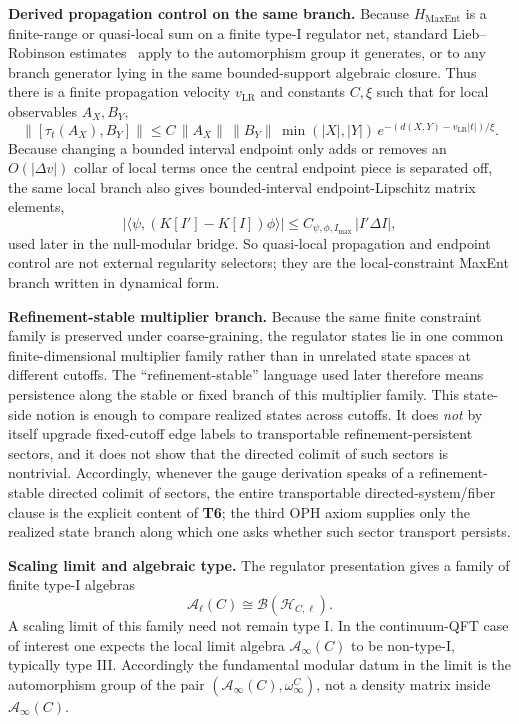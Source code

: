 \textbf{Derived propagation control on the same branch.} Because \(H_{\mathrm{MaxEnt}}\) is a finite-range or quasi-local sum on a finite type-I regulator net, standard Lieb--Robinson estimates~\cite{liebRobinson72} apply to the automorphism group it generates, or to any branch generator lying in the same bounded-support algebraic closure. Thus there is a finite propagation velocity \(v_{\mathrm{LR}}\) and constants \(C,\xi\) such that for local observables \(A_X,B_Y\),
\[
\bigl\|[\tau_t(A_X),B_Y]\bigr\|
\le
C\,\|A_X\|\,\|B_Y\|\,\min(|X|,|Y|)\,
e^{-(d(X,Y)-v_{\mathrm{LR}}|t|)/\xi}.
\]
Because changing a bounded interval endpoint only adds or removes an \(O(|\Delta v|)\) collar of local terms once the central endpoint piece is separated off, the same local branch also gives bounded-interval endpoint-Lipschitz matrix elements,
\[
\left|\langle\psi,(K[I']-K[I])\phi\rangle\right|
\le
C_{\psi,\phi,I_{\max}}\,|I'\Delta I|,
\]
used later in the null-modular bridge. So quasi-local propagation and endpoint control are not external regularity selectors; they are the local-constraint MaxEnt branch written in dynamical form.

\textbf{Refinement-stable multiplier branch.} Because the same finite constraint family is preserved under coarse-graining, the regulator states lie in one common finite-dimensional multiplier family rather than in unrelated state spaces at different cutoffs. The ``refinement-stable'' language used later therefore means persistence along the stable or fixed branch of this multiplier family. This state-side notion is enough to compare realized states across cutoffs. It does \emph{not} by itself upgrade fixed-cutoff edge labels to transportable refinement-persistent sectors, and it does not show that the directed colimit of such sectors is nontrivial. Accordingly, whenever the gauge derivation speaks of a refinement-stable directed colimit of sectors, the entire transportable directed-system/fiber clause is the explicit content of \textbf{T6}; the third OPH axiom supplies only the realized state branch along which one asks whether such sector transport persists.

\textbf{Scaling limit and algebraic type.} The regulator presentation gives a family of finite type-I algebras
\[
\mathcal A_{\ell}(C)\cong \mathcal B(\mathcal H_{C,\ell}).
\]
A scaling limit of this family need not remain type I. In the continuum-QFT case of interest one expects the local limit algebra \(\mathcal A_\infty(C)\) to be non-type-I, typically type III. Accordingly the fundamental modular datum in the limit is the automorphism group of the pair \((\mathcal A_\infty(C),\omega_\infty^C)\), not a density matrix inside \(\mathcal A_\infty(C)\).


